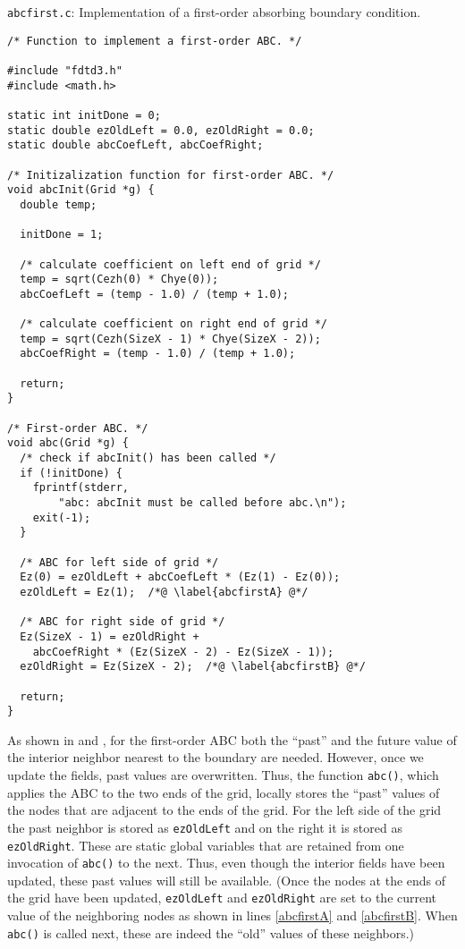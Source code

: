 \begin{program}
{\tt abcfirst.c}: Implementation of a first-order absorbing boundary
condition. 
\label{pro:abcfirst}
\codemiddle
\begin{lstlisting}
/* Function to implement a first-order ABC. */

#include "fdtd3.h"
#include <math.h>

static int initDone = 0;
static double ezOldLeft = 0.0, ezOldRight = 0.0;
static double abcCoefLeft, abcCoefRight;

/* Initizalization function for first-order ABC. */
void abcInit(Grid *g) {
  double temp;
  
  initDone = 1;

  /* calculate coefficient on left end of grid */
  temp = sqrt(Cezh(0) * Chye(0));
  abcCoefLeft = (temp - 1.0) / (temp + 1.0);

  /* calculate coefficient on right end of grid */
  temp = sqrt(Cezh(SizeX - 1) * Chye(SizeX - 2));
  abcCoefRight = (temp - 1.0) / (temp + 1.0);

  return;
}

/* First-order ABC. */
void abc(Grid *g) {
  /* check if abcInit() has been called */
  if (!initDone) {
    fprintf(stderr,
	    "abc: abcInit must be called before abc.\n");
    exit(-1);
  }

  /* ABC for left side of grid */
  Ez(0) = ezOldLeft + abcCoefLeft * (Ez(1) - Ez(0));
  ezOldLeft = Ez(1);  /*@ \label{abcfirstA} @*/

  /* ABC for right side of grid */
  Ez(SizeX - 1) = ezOldRight + 
    abcCoefRight * (Ez(SizeX - 2) - Ez(SizeX - 1));
  ezOldRight = Ez(SizeX - 2);  /*@ \label{abcfirstB} @*/

  return;
}
\end{lstlisting}
\end{program}

As shown in  and ,
for the first-order ABC both the ``past'' and the future value of the
interior neighbor nearest to the boundary are needed.  However, once
we update the fields, past values are overwritten.  Thus, the function
{\tt abc()}, which applies the ABC to the two ends of the grid,
locally stores the ``past'' values of the nodes that are adjacent to
the ends of the grid.  For the left side of the grid the past neighbor
is stored as {\tt ezOldLeft} and on the right it is stored as {\tt
  ezOldRight}.  These are static global variables that are retained
from one invocation of {\tt abc()} to the next.  Thus, even though the
interior fields have been updated, these past values will still be
available.  (Once the nodes at the ends of the grid have been updated,
{\tt ezOldLeft} and {\tt ezOldRight} are set to the current value of
the neighboring nodes as shown in lines \ref{abcfirstA} and
\ref{abcfirstB}.  When {\tt abc()} is called next, these are indeed
the ``old'' values of these neighbors.)

